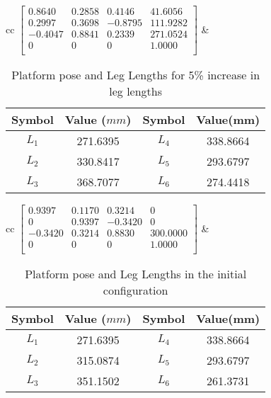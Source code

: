 \documentclass[10pt]{article}
\begin{document}
\begin{table*}[h!]
	\centering
	\begin{tabular}{cc}
		$\begin{bmatrix}
		0.8640  & 0.2858 & 0.4146  & 41.6056  \\ 
		0.2997  & 0.3698 & -0.8795 & 111.9282 \\ 
		-0.4047 & 0.8841 & 0.2339  & 271.0524 \\ 
		0       & 0      & 0       & 1.0000   \\ 
		\end{bmatrix}$
		& 
		\begin{tabular}{cccc}
			\hline
			Symbol & Value ($mm$) & Symbol & Value(mm) \\
			\hline
			$L_1$ & 271.6395 & $L_4$ & 338.8664\\
			$L_2$ & 330.8417 & $L_5$ & 293.6797\\
			$L_3$ & 368.7077 & $L_6$ & 274.4418\\	 	\hline
		\end{tabular}
	\end{tabular}
	\caption{Platform pose and Leg Lengths for 5\% increase in leg lengths}
\end{table*}


\pagebreak

\begin{table*}[h!]
	\centering
	\begin{tabular}{cc}
		$\begin{bmatrix}
		0.9397  & 0.1170 & 0.3214  & 0        \\ 
		0       & 0.9397 & -0.3420 & 0        \\ 
		-0.3420 & 0.3214 & 0.8830  & 300.0000 \\ 
		0       & 0      & 0       & 1.0000   \\ 
		\end{bmatrix}$
		& 
		\begin{tabular}{cccc}
			\hline
			Symbol & Value ($mm$) & Symbol & Value(mm) \\
			\hline
			$L_1$ & 271.6395 & $L_4$ & 338.8664\\
			$L_2$ & 315.0874 & $L_5$ & 293.6797\\
			$L_3$ & 351.1502 & $L_6$ & 261.3731\\	 	\hline
		\end{tabular}
	\end{tabular}
	\caption{Platform pose and Leg Lengths in the initial configuration}
\end{table*}
\end{document}
